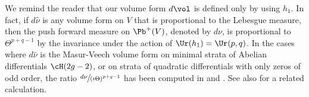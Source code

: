 \begin{Remark}\label{rk:push:meas:n:curvature}
We remind the reader that our volume form $d\vol$ is defined only by using $h_1$.
In fact, if $d\hat{\nu}$ is any volume form on $V$ that is proportional to the Lebesgue measure, then the push forward measure on $\Pb^+(V)$, denoted by $d\nu$, is proportional to $\Theta^{p+q-1}$ by the invariance under the action of $\Ur(h_1)=\Ur(p,q)$.
In the cases where $d\hat{\nu}$ is the Masur-Veech volume form on minimal strata of Abelian differentials $\cH(2g-2)$, or on strata of quadratic differentials with only zeros of odd order, the ratio $\sfrac{d\nu}{(\imath\Theta)^{p+q-1}}$ has been computed in \cite{Sau18} and \cite{CMS19}.
See also \cite[Lem.\,5.1]{Sau20} for a related calculation.
\end{Remark}

